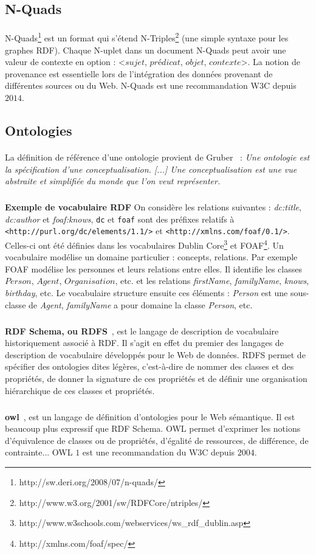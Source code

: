 \subsection{N-Quads}
\paragraph{}
N-Quads\footnote{http://sw.deri.org/2008/07/n-quads/} est un format qui s'étend N-Triples\footnote{http://www.w3.org/2001/sw/RDFCore/ntriples/} (une simple syntaxe pour les graphes RDF). Chaque N-uplet dans un document N-Quads peut avoir une valeur de contexte en option : <$sujet$, $prédicat$, $objet$, $contexte$>. La notion de provenance est essentielle lors de l'intégration des données provenant de différentes sources ou du Web. N-Quads est une recommandation W3C depuis $2014$.
\subsection{Ontologies}
\paragraph{}
La définition de référence d’une ontologie provient de Gruber~\cite{gruber1995} : {\it Une ontologie est la spécification d’une conceptualisation. [...] Une conceptualisation est une vue abstraite et simplifiée du monde que l’on veut représenter.} 
\subparagraph{}
\textbf{Exemple de vocabulaire RDF} On considère les relations suivantes : \textit{dc{:}title}, \textit{dc{:}author} et \textit{foaf{:}knows}, {\tt dc} et {\tt foaf} sont des préfixes relatifs à {\tt<http://purl.org/dc/elements/1.1/>} et {\tt<http://xmlns.com/foaf/0.1/>}. Celles-ci ont été définies dans les vocabulaires Dublin Core\footnote{http://www.w3schools.com/webservices/ws\_rdf\_dublin.asp} et FOAF\footnote{http://xmlns.com/foaf/spec/}. Un vocabulaire modélise un domaine particulier : concepts, relations. Par exemple FOAF modélise les personnes et leurs relations entre elles. Il identifie les classes $Person$, $Agent$, $Organisation$, etc. et les relations \textit{firstName}, \textit{familyName}, \textit{knows}, \textit{birthday}, etc. Le vocabulaire structure ensuite ces  éléments : \textit{Person} est une sous-classe de \textit{Agent}, \textit{familyName} a pour domaine la classe \textit{Person}, etc.
\subparagraph{}
\textbf{RDF Schema, ou RDFS}~\cite{RDF_Schema_W3C:04}, est le langage de description de vocabulaire historiquement associé à RDF. Il s'agit en effet du premier des langages de description de vocabulaire développés pour le Web de données. RDFS permet de spécifier des ontologies dites légères, c'est-à-dire de nommer des classes et des propriétés, de donner la signature de ces propriétés et de définir une organisation hiérarchique de ces classes et propriétés.
\subparagraph{}
\textbf{\gls{owl}}~\cite{OWL_Overview_W3C:04}, est un langage de définition d'ontologies pour le Web sémantique. Il est beaucoup plus expressif que RDF Schema. OWL permet d'exprimer les notions d'équivalence de classes ou de propriétés, d'égalité de ressources, de différence, de contrainte... OWL $1$ est une recommandation du W3C depuis $2004$.
\newpage
